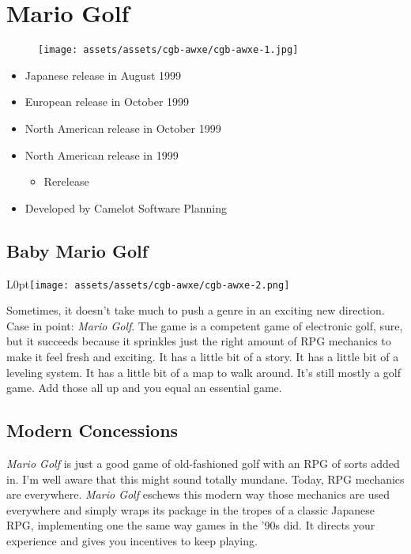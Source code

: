 \documentclass{book}
\begin{document}
\chapter*{Mario Golf}
\vspace{\baselineskip}\begin{figure}[H]{\texttt{[image: assets/assets/cgb-awxe/cgb-awxe-1.jpg]}}\end{figure}\vspace{\baselineskip}
\begin{itemize}[left=0pt, nosep]
\item Japanese release in August 1999
\item European release in October 1999
\item North American release in October 1999
\item North American release in 1999
\begin{itemize}
\item Rerelease
\end{itemize}
\item Developed by Camelot Software Planning

\end{itemize}
\newpage\FloatBarrier\section*{Baby Mario Golf}
\begin{wrapfigure}{L}{0pt}{\texttt{[image: assets/assets/cgb-awxe/cgb-awxe-2.png]}}\end{wrapfigure}\noindent
Sometimes, it doesn’t take much to push a genre in an exciting new direction. Case in point: \emph{Mario Golf}. The game is a competent game of electronic golf, sure, but it succeeds because it sprinkles just the right amount of RPG mechanics to make it feel fresh and exciting. It has a little bit of a story. It has a little bit of a leveling system. It has a little bit of a map to walk around. It’s still mostly a golf game. Add those all up and you equal an essential game.\par
\FloatBarrier\section*{Modern Concessions}
\emph{Mario Golf} is just a good game of old-fashioned golf with an RPG of sorts added in. I’m well aware that this might sound totally mundane. Today, RPG mechanics are everywhere. \emph{Mario Golf} eschews this modern way those mechanics are used everywhere and simply wraps its package in the tropes of a classic Japanese RPG, implementing one the same way games in the ’90s did. It directs your experience and gives you incentives to keep playing.\par
\end{document}
